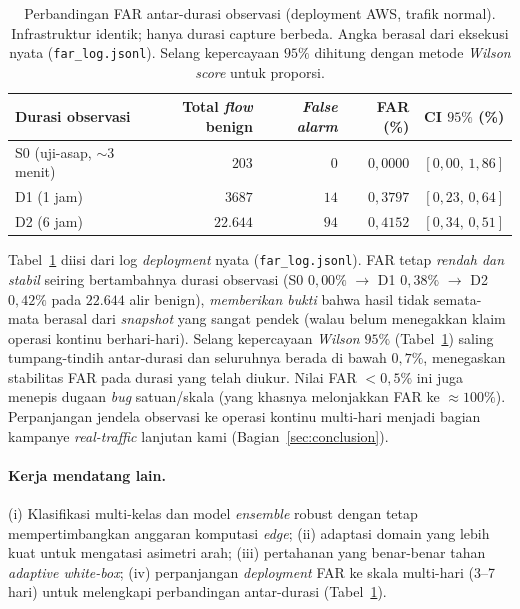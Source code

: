 \documentclass[11pt,a4paper]{article}
\begin{document}
\begin{table}[h]
\centering
\caption{Perbandingan FAR antar-durasi observasi (deployment AWS, trafik
normal). Infrastruktur identik; hanya durasi capture berbeda. Angka berasal dari
eksekusi nyata (\texttt{far\_log.jsonl}). Selang kepercayaan $95\%$ dihitung dengan
metode \emph{Wilson score} untuk proporsi.}
\label{tab:far}
\begin{tabular}{lrrrc}
\toprule
Durasi observasi & Total \emph{flow} benign & \emph{False alarm} & FAR (\%) & CI $95\%$ (\%) \\
\midrule
S0 (uji-asap, $\sim$3 menit) & $203$    & $0$  & $0{,}0000$ & $[0{,}00,\,1{,}86]$ \\
D1 (1 jam)                   & $3687$   & $14$ & $0{,}3797$ & $[0{,}23,\,0{,}64]$ \\
D2 (6 jam)                   & $22{.}644$ & $94$ & $0{,}4152$ & $[0{,}34,\,0{,}51]$ \\
\bottomrule
\end{tabular}
\end{table}

\noindent Tabel~\ref{tab:far} diisi dari log \emph{deployment} nyata
(\texttt{far\_log.jsonl}). FAR tetap \emph{rendah dan stabil} seiring bertambahnya
durasi observasi (S0 $0{,}00\%$ $\rightarrow$ D1 $0{,}38\%$ $\rightarrow$ D2
$0{,}42\%$ pada $22{.}644$ alir benign), \emph{memberikan bukti} bahwa hasil tidak
semata-mata berasal dari \emph{snapshot} yang sangat pendek (walau belum menegakkan
klaim operasi kontinu berhari-hari). Selang kepercayaan \emph{Wilson} $95\%$
(Tabel~\ref{tab:far}) saling tumpang-tindih antar-durasi dan seluruhnya berada di
bawah $0{,}7\%$, menegaskan stabilitas FAR pada durasi yang telah diukur. Nilai FAR
$<0{,}5\%$ ini juga menepis dugaan \emph{bug}
satuan/skala (yang khasnya melonjakkan FAR ke $\approx 100\%$). Perpanjangan
jendela observasi ke operasi kontinu multi-hari menjadi bagian kampanye
\emph{real-traffic} lanjutan kami (Bagian~\ref{sec:conclusion}).

\ifadversarial
\paragraph{Kerja mendatang lain.} (i) Klasifikasi multi-kelas dan model
\emph{ensemble} robust dengan tetap mempertimbangkan anggaran komputasi
\emph{edge}; (ii) adaptasi domain yang lebih kuat untuk mengatasi asimetri arah;
(iii) pertahanan yang benar-benar tahan \emph{adaptive white-box};
(iv) perpanjangan \emph{deployment} FAR ke skala multi-hari (3--7 hari) untuk
melengkapi perbandingan antar-durasi (Tabel~\ref{tab:far}).
\else
\end{document}
